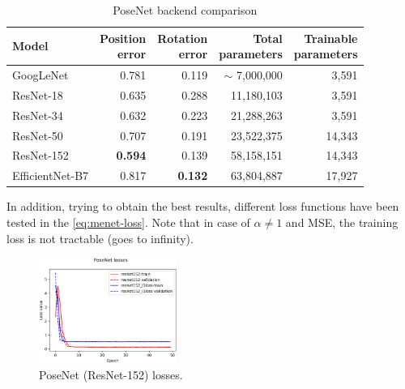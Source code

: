 \begin{table}[htbp]
    \caption{PoseNet backend comparison}
    \begin{center}
        \begin{tabular}{lrrrr}
            \toprule
            {Model}         & \thead{Position                                              \\error} & \thead{Rotation\\error} & \thead{Total\\parameters} & \thead{Trainable\\parameters} \\
            \midrule
            GoogLeNet       & 0.781           & 0.119          & $\sim$ 7,000,000 & 3,591  \\
            ResNet-18       & 0.635           & 0.288          & 11,180,103       & 3,591  \\
            ResNet-34       & 0.632           & 0.223          & 21,288,263       & 3,591  \\
            ResNet-50       & 0.707           & 0.191          & 23,522,375       & 14,343 \\
            ResNet-152      & \textbf{0.594}  & 0.139          & 58,158,151       & 14,343 \\
            EfficientNet-B7 & 0.817           & \textbf{0.132} & 63,804,887       & 17,927 \\
            \bottomrule
        \end{tabular}
        \label{tab:posenet-backends}
    \end{center}
\end{table}

In addition, trying to obtain the best results, different loss functions have been tested in the \cref{eq:menet-loss}. Note that in case of $\alpha \neq 1$ and MSE, the training loss is not tractable (goes to infinity).
\begin{figure}[htbp]
    \begin{center}
        \includegraphics[width=0.4\textwidth]{./imgs/posenet_losses.png}
    \end{center}
    \caption{PoseNet (ResNet-152) losses.}
    \label{fig:posenet-losses}
\end{figure}

